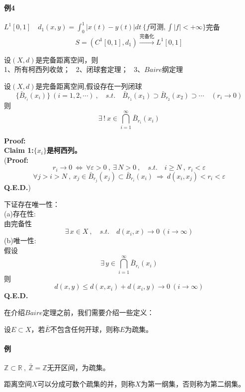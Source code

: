 \paragraph*{例4} \quad $L^1[0,1] \quad d_1(x,y)=\int_0^1|x(t)-y(t)|dt \ \{f\text{可测},\int|f|<+\infty\}$完备
\[S=\left(C^1[0,1],d_1\right) \xrightarrow{\text{完备化}} L^1[0,1]\]

\begin{theorem}
    设$(X,d)$是完备距离空间，则\\
    1、所有柯西列收敛； \ 2、闭球套定理； \ 3、$Baire$纲定理
\end{theorem}
\begin{theorem}[闭球套定理]
设$(X,d)$是完备距离空间,假设存在一列闭球
\[\{\bar{B}_{r_i}(x_i)\} \ (i=1,2,\cdots) \ , \quad s.t. \quad \bar{B}_{r_1}(x_1) \supset \bar{B}_{r_2}(x_2) \supset \cdots \quad (r_i \to 0)\]
则
\[\exists \, ! \ x \in \bigcap_{i=1}^{\infty}\bar{B}_{r_i}(x_i)\]
\end{theorem}

\textbf{Proof:}\\
\textbf{Claim 1:$\{x_i\}$是柯西列。}\\
(\textbf{Proof:}
\[r_i \to 0 \ \Leftrightarrow \ \forall \varepsilon>0 \ , \ \exists \, N>0 \ , \quad s.t. \quad i \geq N \ , \ r_i<\varepsilon\]
\[\forall j>i>N \ , \ x_j \in \bar{B}_{r_j}(x_j) \subset \bar{B}_{r_i}(x_i) \ \Rightarrow \ d(x_i,x_j)<r_i<\varepsilon\]
\textbf{Q.E.D.})

下证存在唯一性：\\
(a)存在性:\\
由完备性
\[\exists \, x \in X \ , \quad s.t. \quad d(x_i,x) \rightarrow 0 \ (i \rightarrow \infty)\]
(b)唯一性:\\
假设
\[\exists \, y \in \bigcap_{i=1}^{\infty}\bar{B}_{r_i}(x_i)\]
则
\[d(x,y) \leq d(x,x_i)+d(x_i,y) \rightarrow 0 \ (i \rightarrow \infty)\]
\textbf{Q.E.D.} 

在介绍$Baire$定理之前，我们需要介绍一些定义：
\begin{definition}[疏集]
    设$E \subset X$，若$\bar{E}$不包含任何开球，则称$E$为疏集。
\end{definition}
\paragraph*{例} \quad $\mathbb{Z} \subset \mathbb{R} \ , \ \bar{\mathbb{Z}}=\mathbb{Z}$无开区间，为疏集。
\begin{definition}
    距离空间$X$可以分成可数个疏集的并，则称$X$为第一纲集，否则称为第二纲集。
\end{definition}
